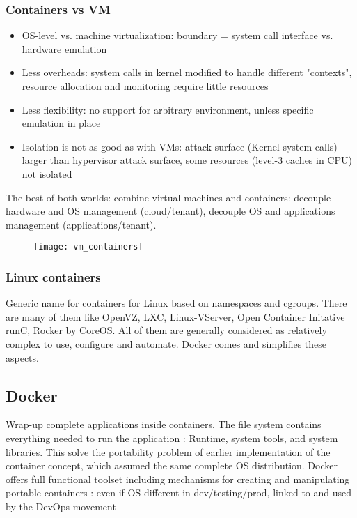 \subsubsection{Containers vs VM}

\begin{itemize}
    \item OS-level vs. machine virtualization: boundary = system call interface vs. hardware emulation
    \item Less overheads: system calls in kernel modified to handle different "contexts", resource allocation and monitoring require little resources
    \item Less flexibility: no support for arbitrary environment, unless specific emulation in place
    \item Isolation is not as good as with VMs: attack surface (Kernel system calls) larger than hypervisor attack surface, some resources (level-3 caches in CPU) not isolated
\end{itemize}

The best of both worlds: combine virtual machines and containers: decouple hardware and OS management (cloud/tenant), decouple OS and applications management (applications/tenant).

\begin{figure}[H]
    \centering
    \texttt{[image: vm\_containers]}
\end{figure}

\subsubsection{Linux containers}

Generic name for containers for Linux based on namespaces and cgroups. There are many of them like OpenVZ, LXC, Linux-VServer, Open Container Initative runC, Rocker by CoreOS. All of them are generally considered as relatively complex to use, configure and automate. Docker comes and simplifies these aspects.

\subsection{Docker}

Wrap-up complete applications inside containers. The file system contains everything needed to run the application : Runtime, system tools, and system libraries. This solve the portability problem of earlier implementation of the container concept, which assumed the same complete OS distribution. Docker offers full functional toolset including mechanisms for creating and manipulating portable containers : even if OS different in dev/testing/prod, linked to and used by the DevOps movement

